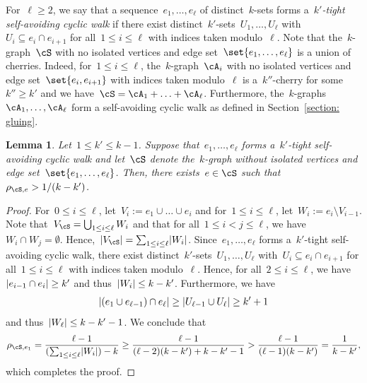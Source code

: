 \documentclass[11pt]{amsart}
\DeclarePairedDelimiter{\paren}{\lparen}{\rparen}
\DeclarePairedDelimiter{\abs}{\lvert}{\rvert}
\newtheorem{lemma}[algocf]{Lemma}
\theoremstyle{definition}
\numberwithin{equation}{section}
\begin{document}
	For~$\ell\geq 2$, we say that a sequence~$e_1,\ldots,e_\ell$ of distinct~$k$-sets forms a~\emph{$k'$-tight self-avoiding cyclic walk} if there exist distinct~$k'$-sets~$U_1,\ldots,U_\ell$ with~$U_i\subseteq e_{i}\cap e_{i+1}$ for all~$1\leq i\leq \ell$ with indices taken modulo~$\ell$.
	Note that the~$k$-graph~$\cS$ with no isolated vertices and edge set~$\set{e_1,\ldots,e_\ell}$ is a union of cherries.
	Indeed, for~$1\leq i\leq\ell$, the~$k$-graph~$\cA_i$ with no isolated vertices and edge set~$\set{e_i,e_{i+1}}$ with indices taken modulo~$\ell$ is a~$k''$-cherry for some~$k''\geq k'$ and we have~$\cS=\cA_1+\ldots+\cA_\ell$.
	Furthermore, the~$k$-graphs~$\cA_1,\ldots,\cA_\ell$ form a self-avoiding cyclic walk as defined in Section~\ref{section: gluing}.
	
	\begin{lemma}\label{lemma: strictly balanced gluing rest density cherry}
		Let~$1\leq k'\leq k-1$.
		Suppose that~$e_1,\ldots,e_\ell$ forms a~$k'$-tight self-avoiding cyclic walk and let~$\cS$ denote the~$k$-graph without isolated vertices and edge set~$\set{e_1,\ldots,e_\ell}$.
		Then, there exists~$e\in\cS$ such that~$\rho_{\cS,e}>1/(k-k')$.
	\end{lemma}
	\begin{proof}
		For~$0\leq i\leq\ell$, let~$V_i:=e_1\cup\ldots\cup e_i$ and for~$1\leq i\leq\ell$, let~$W_i:=e_i\setminus V_{i-1}$.
		Note that~$V_\cS=\bigcup_{1\leq i\leq \ell} W_i$ and that for all~$1\leq i<j\leq \ell$, we have~$W_i\cap W_j=\emptyset$.
		Hence,~$\abs{V_\cS}=\sum_{1\leq i\leq\ell} \abs{W_i}$.
		Since~$e_1,\ldots,e_\ell$ forms a~$k'$-tight self-avoiding cyclic walk, there exist distinct~$k'$-sets~$U_1,\ldots,U_\ell$ with~$U_i\subseteq e_{i}\cap e_{i+1}$ for all~$1\leq i\leq \ell$ with indices taken modulo~$\ell$.
		Hence, for all~$2\leq i\leq\ell$, we have~$\abs{e_{i-1}\cap e_i}\geq k'$ and thus~$\abs{W_i}\leq k-k'$.
		Furthermore, we have
		\begin{equation*}
			\abs{ (e_1\cup e_{\ell-1})\cap e_\ell }
			\geq\abs{ U_{\ell-1}\cup U_\ell }
			\geq k'+1
		\end{equation*}
		and thus~$\abs{W_\ell}\leq k-k'-1$.
		We conclude that
		\begin{equation*}
			\rho_{\cS,e_1}
			=\frac{\ell-1}{\paren{\sum_{1\leq i\leq\ell} \abs{W_i}}-k}
			\geq \frac{\ell-1}{(\ell-2)(k-k')+k-k'-1}
			>\frac{\ell-1}{(\ell-1)(k-k')}
			=\frac{1}{k-k'},
		\end{equation*}
		which completes the proof.
	\end{proof}
	
\end{document}
